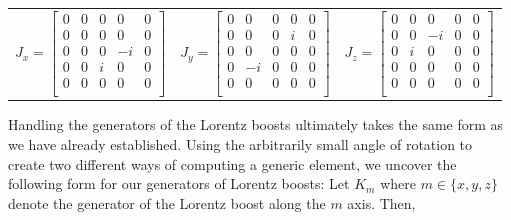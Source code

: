 \documentclass[10pt]{ucthesis}
\begin{document}
\begin{center}
\begin{tabular}{ccc}
	$J_x = \begin{bmatrix}
				0 & 0 & 0 & 0 & 0 \\
				0 & 0 & 0 & 0 & 0\\
				0 & 0 & 0 & -i & 0\\
				0 & 0 & i & 0 & 0\\
				0 & 0 & 0 & 0 & 0\\
			\end{bmatrix}$ &
	$J_y = \begin{bmatrix}
				0 & 0 & 0 & 0 & 0 \\
				0 & 0 & 0 & i & 0\\
				0 & 0 & 0 & 0 & 0\\
				0 & -i & 0 & 0 & 0\\
				0 & 0 & 0 & 0 & 0\\
			\end{bmatrix}$ &
	$J_z = \begin{bmatrix}
				0 & 0 & 0 & 0 & 0 \\
				0 & 0 & -i & 0 & 0\\
				0 & i & 0 & 0 & 0\\
				0 & 0 & 0 & 0 & 0\\
				0 & 0 & 0 & 0 & 0\\
			\end{bmatrix}$ 
\end{tabular}
\end{center}

Handling the generators of the Lorentz boosts ultimately takes the same form as we have already established. Using the arbitrarily small angle of rotation to create two different ways of computing a generic element, we uncover the following form for our generators of Lorentz boosts: Let $K_m$ where $m\in\{x,y,z\}$ denote the generator of the Lorentz boost along the $m$ axis. Then,
\end{document}
